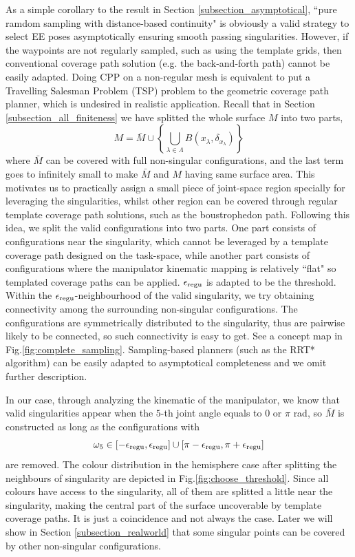 \documentclass[Afour,sageh,times]{sagej}
\begin{document}
As a simple corollary to the result in Section \ref{subsection_asymptotical}, ``pure ramdom sampling with distance-based continuity" is obviously a valid strategy to select EE poses asymptotically ensuring smooth passing singularities. However, if the waypoints are not regularly sampled, such as using the template grids, then conventional coverage path solution (e.g. the back-and-forth path) cannot be easily adapted. Doing CPP on a non-regular mesh is equivalent to put a Travelling Salesman Problem (TSP) problem to the geometric coverage path planner, which is undesired in realistic application. 
Recall that in Section \ref{subsection_all_finiteness} we have splitted the whole surface $M$ into two parts, 
\begin{equation}
M = \bar{M} \cup \left\{\bigcup\limits_{\lambda\in \Lambda}B(x_\lambda, \delta_{x_\lambda})\right\}
\end{equation}
where $\bar{M}$ can be covered with full non-singular configurations, and the last term goes to infinitely small to make $\bar{M}$ and $M$ having same surface area. This motivates us to practically assign a small piece of joint-space region specially for leveraging the singularities, whilst other region can be covered through regular template coverage path solutions, such as the boustrophedon path. 
Following this idea, we split the valid configurations into two parts. One part consists of configurations near the singularity, which cannot be leveraged by a template coverage path designed on the task-space, while another part consists of configurations where the manipulator kinematic mapping is relatively ``flat" so templated coverage paths can be applied. 
$\epsilon_{\rm regu}$ is adapted to be the threshold. 
Within the $\epsilon_{\rm regu}$-neighbourhood of the valid singularity, we try obtaining connectivity among the surrounding non-singular configurations. The configurations are symmetrically distributed to the singularity, thus are pairwise likely to be connected, so such connectivity is easy to get. 
See a concept map in Fig.\ref{fig:complete_sampling}. 
Sampling-based planners (such as the RRT*~\cite{Karaman2011Sampling} algorithm) can be easily adapted to asymptotical completeness and we omit further description. 

In our case, through analyzing the kinematic of the manipulator, we know that valid singularities appear when the $5$-th joint angle equals to $0$ or $\pi$ rad, so $\bar{M}$ is constructed as long as the configurations with 
\begin{equation}\label{equ_remove_neighbour}
\omega_5\in [-\epsilon_{\rm regu}, \epsilon_{\rm regu}]\cup [\pi-\epsilon_{\rm regu}, \pi+\epsilon_{\rm regu}]
\end{equation} 
are removed. 
The colour distribution in the hemisphere case after splitting the neighbours of singularity are depicted in Fig.\ref{fig:choose_threshold}. Since all colours have access to the singularity, all of them are splitted a little near the singularity, making the central part of the surface uncoverable by template coverage paths. It is just a coincidence and not always the case. Later we will show in Section \ref{subsection_realworld} that some singular points can be covered by other non-singular configurations. 
\end{document}
